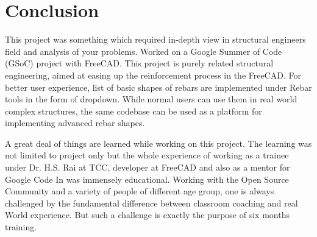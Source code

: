 \section{Conclusion}

This project was something which required in-depth view in structural engineers field and analysis of your problems. Worked on a Google Summer of Code (GSoC) project with FreeCAD. This project is purely related structural engineering, aimed at easing up the reinforcement process in the FreeCAD. For better user experience, list of basic shapes of rebars are implemented under Rebar tools in the form of dropdown. While normal users can use them in real world complex structures, the same codebase can be used as a platform for implementing advanced rebar shapes.

A great deal of things are learned while working on this project. The learning was not limited to project only but
the whole experience of working as a trainee under Dr. H.S. Rai at TCC, developer at FreeCAD and also as a mentor for Google Code In was immensely educational. Working with the Open Source Community and a variety of people of different age group, one is always challenged by the fundamental difference between classroom coaching and real World experience. But such a challenge is exactly the purpose of six months training.

